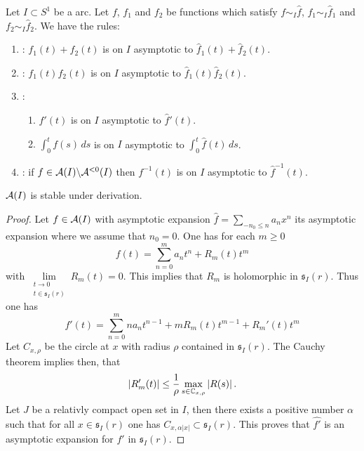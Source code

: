 \begin{rem}
  Let $I\subset S^1$ be a arc.
  Let $f$, $f_1$ and $f_2$ be functions which satisfy $f\sim_I\hat f$,
  $f_1\sim_I\hat f_1$ and $f_2\sim_I\hat f_2$.
  We have the rules:
  \begin{enumerate}
    \item \cite[4.5.Thm.13]{Balser2000Formal}:
      $f_1(t)+f_2(t)$ is on $I$ asymptotic to $\hat f_1(t)+\hat f_2(t)$.
    \item \cite[4.5.Thm.14]{Balser2000Formal}:
      $f_1(t)f_2(t)$ is on $I$ asymptotic to $\hat f_1(t)\hat f_2(t)$.
    \item \cite[4.5.Thm.20]{Balser2000Formal}:
      \begin{enumerate}
        \item $f'(t)$ is on $I$ asymptotic to $\hat f'(t)$.
        \item $\int_0^tf(s)\,ds$ is on $I$ asymptotic to $\int_0^t\hat f(t)\,ds$.
      \end{enumerate}
    \item \cite[4.5.Thm.21]{Balser2000Formal}:
      if $f\in\mathcal{A}(I)\backslash\mathcal{A}^{<0}(I)$ then
      $f^{-1}(t)$ is on $I$ asymptotic to $\hat f^{-1}(t)$.
  \end{enumerate}
\end{rem}
\begin{lem}
  $\mathcal{A}(I)$ is stable under derivation.
\end{lem}
\begin{proof}
  Let $f\in\mathcal{A}(I)$ with asymptotic expansion $\hat f=\sum_{-n_0\leq n}a_nx^n$
  its asymptotic expansion where we assume that $n_0=0$.
  One has for each $m\geq0$
  \[
    f(t)=\sum_{n=0}^ma_nt^n+R_m(t)t^m
  \]
  with $\underset{\substack{t\to0\\t\in\mathfrak{s}_I(r)}}{\lim}R_m(t)=0$.
  This implies that $R_m$ is holomorphic in $\mathfrak{s}_I(r)$.
  Thus one has
  \[
    f'(t)=\sum_{n=0}^mna_nt^{n-1}+mR_m(t)t^{m-1}+R_m'(t)t^m
  \]
  Let $C_{x,\rho}$ be the circle at $x$ with radius $\rho$ contained in
  $\mathfrak{s}_I(r)$. The Cauchy theorem implies then, that
  \[
    |R_m'(t)|\leq\frac{1}{\rho}\max_{s\in\mathbb{C}_{x,\rho}}|R(s)| \,.
  \]
  Let $J$ be a relativly compact open set in $I$, then there exists a positive
  number $\alpha$ such that for all $x\in\mathfrak{s}_I(r)$ one has
  $C_{x,\alpha|x|}\subset\mathfrak{s}_I(r)$.
  \TODO{}
  This proves that $\hat{f'}$ is an asymptotic expansion for $f'$ in
  $\mathfrak{s}_I(r)$.
\end{proof}

